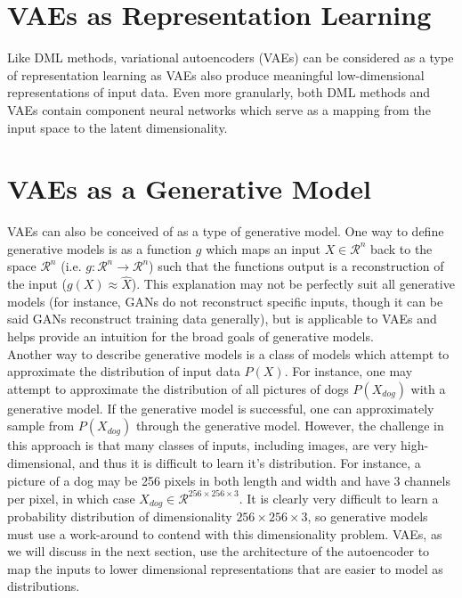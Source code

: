 \documentclass[./dissertation.tex]{subfiles}
\begin{document}

    \section{VAEs as Representation Learning}
    Like DML methods, variational autoencoders (VAEs) can be considered as a type of representation learning as VAEs also produce meaningful low-dimensional representations of input data. Even more granularly, both DML methods and VAEs contain component neural networks which serve as a mapping from the input space to the latent dimensionality. 
    
    \section{VAEs as a Generative Model}
    VAEs can also be conceived of as a type of generative model. One way to define generative models is as a function $g$ which maps an input $X \in \mathcal{R}^{n}$ back to the space $\mathcal{R}^{n}$ (i.e. $g: \mathcal{R}^{n} \to \mathcal{R}^{n}$) such that the functions output is a reconstruction of the input ($g(X) \approx \hat{X}$). This explanation may not be perfectly suit all generative models (for instance, GANs do not reconstruct specific inputs, though it can be said GANs reconstruct training data generally), but is applicable to VAEs and helps provide an intuition for the broad goals of generative models.  \\
    
    Another way to describe generative models is a class of models which attempt to approximate the distribution of input data $P(X)$. For instance, one may attempt to approximate the distribution of all pictures of dogs $P(X_{dog})$ with a generative model. If the generative model is successful, one can approximately sample from $P(X_{dog})$ through the generative model. However, the challenge in this approach is that many classes of inputs, including images, are very high-dimensional, and thus it is difficult to learn it's distribution. For instance, a picture of a dog may be 256 pixels in both length and width and have 3 channels per pixel, in which case $X_{dog} \in \mathcal{R}^{256 \times 256 \times 3}$. It is clearly very difficult to learn a probability distribution of dimensionality ${256 \times 256 \times 3}$, so generative models must use a work-around to contend with this dimensionality problem. VAEs, as we will discuss in the next section, use the architecture of the autoencoder to map the inputs to lower dimensional representations that are easier to model as distributions. 
    
\end{document}
